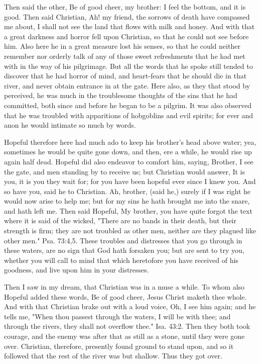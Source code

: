 Then said the other, Be of good cheer, my brother: I feel the bottom,
and it is good. Then said Christian, Ah! my friend, the sorrows of
death have compassed me about, I shall not see the land that flows with
milk and honey. And with that a great darkness and horror fell upon
Christian, so that he could not see before him. Also here he in a great
measure lost his senses, so that he could neither remember nor orderly
talk of any of those sweet refreshments that he had met with in the way
of his pilgrimage. But all the words that he spoke still tended to
discover that he had horror of mind, and heart-fears that he should die
in that river, and never obtain entrance in at the gate. Here also, as
they that stood by perceived, he was much in the troublesome thoughts
of the sins that he had committed, both since and before he began to be
a pilgrim. It was also observed that he was troubled with apparitions
of hobgoblins and evil spirits; for ever and anon he would intimate so
much by words.

Hopeful therefore here had much ado to keep his brother's head above
water; yea, sometimes he would be quite gone down, and then, ere a
while, he would rise up again half dead. Hopeful did also endeavor to
comfort him, saying, Brother, I see the gate, and men standing by to
receive us; but Christian would answer, It is you, it is you they wait
for; for you have been hopeful ever since I knew you. And so have you,
said he to Christian. Ah, brother, (said he,) surely if I was right he
would now arise to help me; but for my sins he hath brought me into the
snare, and hath left me. Then said Hopeful, My brother, you have quite
forgot the text where it is said of the wicked, "There are no bands in
their death, but their strength is firm; they are not troubled as other
men, neither are they plagued like other men." Psa. 73:4,5. These
troubles and distresses that you go through in these waters, are no
sign that God hath forsaken you; but are sent to try you, whether you
will call to mind that which heretofore you have received of his
goodness, and live upon him in your distresses.

Then I saw in my dream, that Christian was in a muse a while. To whom
also Hopeful added these words, Be of good cheer, Jesus Christ maketh
thee whole. And with that Christian brake out with a loud voice, Oh, I
see him again; and he tells me, "When thou passest through the waters,
I will be with thee; and through the rivers, they shall not overflow
thee." Isa. 43:2. Then they both took courage, and the enemy was after
that as still as a stone, until they were gone over. Christian,
therefore, presently found ground to stand upon, and so it followed
that the rest of the river was but shallow. Thus they got over.

